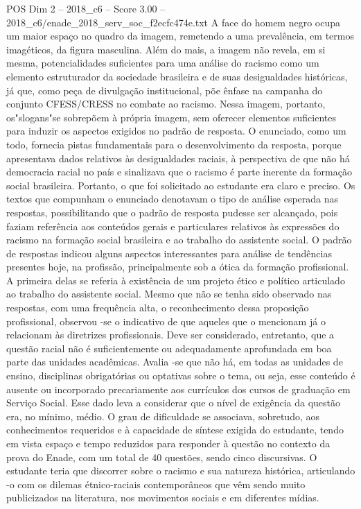 \begin{textsample}{POS Dim 2 – 2018\_c6 – Score 3.00 – 2018\_c6/enade\_2018\_serv\_soc\_f2ecfc474e.txt}
A face do homem negro ocupa um maior espaço no quadro da imagem, remetendo a uma prevalência, em termos imagéticos, da figura masculina.
Além do mais, a imagem não revela, em si mesma, potencialidades suficientes para uma análise do racismo como um elemento estruturador da sociedade brasileira e de suas desigualdades históricas, já que, como peça de divulgação institucional, põe ênfase na campanha do conjunto CFESS/CRESS no combate ao racismo.
Nessa imagem, portanto, os"slogans"se sobrepõem à própria imagem, sem oferecer elementos suficientes para induzir os aspectos exigidos no padrão de resposta.
O enunciado, como um todo, fornecia pistas fundamentais para o desenvolvimento da resposta, porque apresentava dados relativos às desigualdades raciais, à perspectiva de que não há democracia racial no país e sinalizava que o racismo é parte inerente da formação social brasileira.
Portanto, o que foi solicitado ao estudante era claro e preciso.
Os textos que compunham o enunciado denotavam o tipo de análise esperada nas respostas, possibilitando que o padrão de resposta pudesse ser alcançado, pois faziam referência aos conteúdos gerais e particulares relativos às expressões do racismo na formação social brasileira e ao trabalho do assistente social.
O padrão de respostas indicou alguns aspectos interessantes para análise de tendências presentes hoje, na profissão, principalmente sob a ótica da formação profissional.
A primeira delas se referia à existência de um projeto ético e político articulado ao trabalho do assistente social.
Mesmo que não se tenha sido observado nas respostas, com uma frequência alta, o reconhecimento dessa proposição profissional, observou -se o indicativo de que aqueles que o mencionam já o relacionam às diretrizes profissionais.
Deve ser considerado, entretanto, que a questão racial não é suficientemente ou adequadamente aprofundada em boa parte das unidades acadêmicas.
Avalia -se que não há, em todas as unidades de ensino, disciplinas obrigatórias ou optativas sobre o tema, ou seja, esse conteúdo é ausente ou incorporado precariamente aos currículos dos cursos de graduação em Serviço Social.
Esse dado leva a considerar que o nível de exigência da questão era, no mínimo, médio.
O grau de dificuldade se associava, sobretudo, aos conhecimentos requeridos e à capacidade de síntese exigida do estudante, tendo em vista espaço e tempo reduzidos para responder à questão no contexto da prova do Enade, com um total de 40 questões, sendo cinco discursivas.
O estudante teria que discorrer sobre o racismo e sua natureza histórica, articulando -o com os dilemas étnico-raciais contemporâneos que vêm sendo muito publicizados na literatura, nos movimentos sociais e em diferentes mídias.

\end{textsample}
